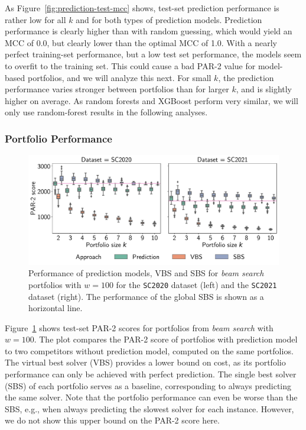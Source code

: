 \documentclass[a4paper,USenglish,pdfa]{lipics-v2021} %
\begin{document}
As Figure~\ref{fig:prediction-test-mcc} shows, test-set prediction performance is rather low for all $k$ and for both types of prediction models.
Prediction performance is clearly higher than with random guessing, which would yield an MCC of 0.0, but clearly lower than the optimal MCC of 1.0.
With a nearly perfect training-set performance, but a low test set performance, the models seem to overfit to the training set.
This could cause a bad \mbox{PAR-2} value for model-based portfolios, and we will analyze this next.
For small $k$, the prediction performance varies stronger between portfolios than for larger $k$, and is slightly higher on average.
As random forests and XGBoost perform very similar, we will only use random-forest results in the following analyses.

\subsubsection{Portfolio Performance}

\begin{figure}[htb]
	\centering
	\includegraphics[width=\columnwidth]{plots/prediction-test-objective-beam.pdf}
	\caption{
		Performance of prediction models, VBS and SBS for \emph{beam search} portfolios with $w=100$ for the \texttt{SC2020} dataset (left) and the \texttt{SC2021} dataset (right).
		The performance of the global SBS is shown as a horizontal line.}
	\label{fig:prediction-test-objective-beam}
\end{figure}

Figure~\ref{fig:prediction-test-objective-beam} shows test-set PAR-2 scores for portfolios from \emph{beam search} with $w=100$.
The plot compares the PAR-2 score of portfolios with prediction model to two competitors without prediction model, computed on the same portfolios.
The virtual best solver (VBS) provides a lower bound on cost, as its portfolio performance can only be achieved with perfect prediction.
The single best solver (SBS) of each portfolio serves as a baseline, corresponding to always predicting the same solver.
Note that the portfolio performance can even be worse than the SBS, e.g., when always predicting the slowest solver for each instance.
However, we do not show this upper bound on the PAR-2 score here.
\end{document}
